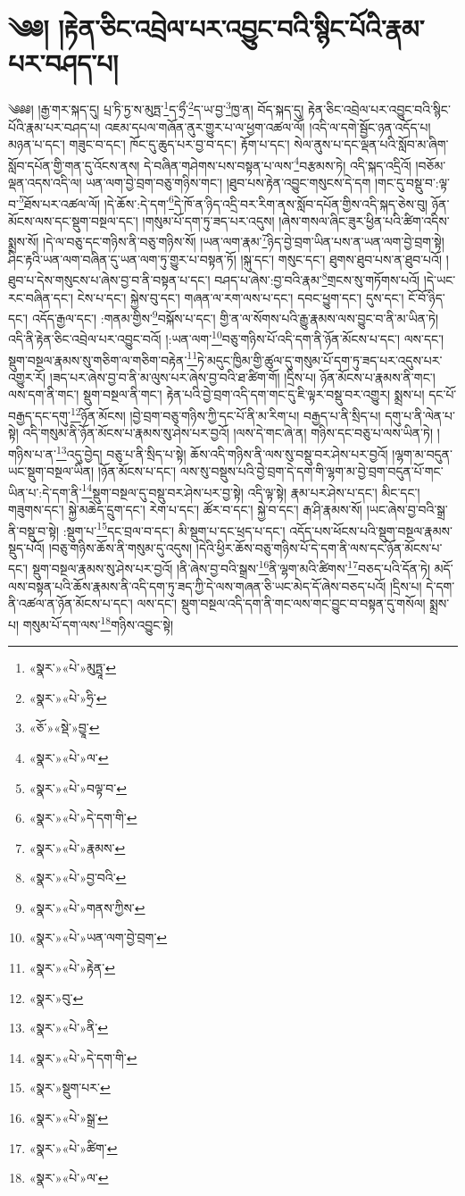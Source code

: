 \chapter{༄༅། །རྟེན་ཅིང་འབྲེལ་པར་འབྱུང་བའི་སྙིང་པོའི་རྣམ་པར་བཤད་པ།}༄༅༅། །རྒྱ་གར་སྐད་དུ། པྲ་ཏི་ཏྱ་ས་མུཏྤ་\footnote{«སྣར་»«པེ་»མུཏྤཱ་}ད་ཧྲྀ་\footnote{«སྣར་»«པེ་»ཧྲི་}ད་ཡ་བྱ་\footnote{«ཅོ་»«སྡེ་»བྱཱ་}ཁྱ་ན། བོད་སྐད་དུ། རྟེན་ཅིང་འབྲེལ་པར་འབྱུང་བའི་སྙིང་པོའི་རྣམ་པར་བཤད་པ། འཇམ་དཔལ་གཞོན་ནུར་གྱུར་པ་ལ་ཕྱག་འཚལ་ལོ། །འདི་ལ་དགེ་སྦྱོང་ཉན་འདོད་པ། མཉན་པ་དང་། གཟུང་བ་དང་། ཁོང་དུ་ཆུད་པར་བྱ་བ་དང་། རྟོག་པ་དང་། སེལ་ནུས་པ་དང་ལྡན་པའི་སློབ་མ་ཞིག་སློབ་དཔོན་གྱི་གན་དུ་འོངས་ནས། དེ་བཞིན་གཤེགས་པས་བསྟན་པ་ལས་\footnote{«སྣར་»«པེ་»ལ་}བརྩམས་ཏེ། འདི་སྐད་འདྲིའོ། །བཅོམ་ལྡན་འདས་འདི་ལ། ཡན་ལག་བྱེ་བྲག་བཅུ་གཉིས་གང་། །ཐུབ་པས་རྟེན་འབྱུང་གསུངས་དེ་དག །གང་དུ་བསྡུ་བ་:ལྟ་བ་\footnote{«སྣར་»«པེ་»བལྟ་བ་}ཐོས་པར་འཚལ་ལོ། །དེ་ཆོས་:དེ་དག་\footnote{«སྣར་»«པེ་»དེ་དག་གི་}དེ་ཁོ་ན་ཉིད་འདྲི་བར་རིག་ནས་སློབ་དཔོན་གྱིས་འདི་སྐད་ཅེས་བུ། ཉོན་མོངས་ལས་དང་སྡུག་བསྔལ་དང་། །གསུམ་པོ་དག་ཏུ་ཟད་པར་འདུས། །ཞེས་གསལ་ཞིང་ཟུར་ཕྱིན་པའི་ཚིག་འདིས་སྨྲས་སོ། །དེ་ལ་བཅུ་དང་གཉིས་ནི་བཅུ་གཉིས་སོ། །ཡན་ལག་རྣམ་\footnote{«སྣར་»«པེ་»རྣམས་}ཉིད་བྱེ་བྲག་ཡིན་པས་ན་ཡན་ལག་བྱེ་བྲག་སྟེ། ཤིང་རྟའི་ཡན་ལག་བཞིན་དུ་ཡན་ལག་ཏུ་གྱུར་པ་བསྟན་ཏོ། །སྐུ་དང་། གསུང་དང་། ཐུགས་ཐུབ་པས་ན་ཐུབ་པའོ། །ཐུབ་པ་དེས་གསུངས་པ་ཞེས་བྱ་བ་ནི་བསྟན་པ་དང་། བཤད་པ་ཞེས་:བྱ་བའི་རྣམ་\footnote{«སྣར་»«པེ་»བྱ་བའི་}གྲངས་སུ་གཏོགས་པའོ། །དེ་ཡང་རང་བཞིན་དང་། ངེས་པ་དང་། སྐྱེས་བུ་དང་། གཞན་ལ་རག་ལས་པ་དང་། དབང་ཕྱུག་དང་། དུས་དང་། ངོ་བོ་ཉིད་དང་། འདོད་རྒྱལ་དང་། :གནམ་གྱིས་\footnote{«སྣར་»«པེ་»གནས་ཀྱིས་}བསྐོས་པ་དང་། གྱི་ན་ལ་སོགས་པའི་རྒྱུ་རྣམས་ལས་བྱུང་བ་ནི་མ་ཡིན་ཏེ། འདི་ནི་རྟེན་ཅིང་འབྲེལ་པར་འབྱུང་བའོ། །:ཡན་ལག་\footnote{«སྣར་»«པེ་»ཡན་ལག་བྱེ་བྲག་}བཅུ་གཉིས་པོ་འདི་དག་ནི་ཉོན་མོངས་པ་དང་། ལས་དང་། སྡུག་བསྔལ་རྣམས་སུ་གཅིག་ལ་གཅིག་བརྟེན་\footnote{«སྣར་»«པེ་»རྟེན་}ཏེ་མདུང་ཁྱིམ་གྱི་ཚུལ་དུ་གསུམ་པོ་དག་ཏུ་ཟད་པར་འདུས་པར་འགྱུར་རོ། །ཟད་པར་ཞེས་བྱ་བ་ནི་མ་ལུས་པར་ཞེས་བྱ་བའི་ཐ་ཚིག་གོ། །དྲིས་པ། ཉོན་མོངས་པ་རྣམས་ནི་གང་། ལས་དག་ནི་གང་། སྡུག་བསྔལ་ནི་གང་། རྟེན་པའི་བྱེ་བྲག་འདི་དག་གང་དུ་ཇི་ལྟར་བསྡུ་བར་འགྱུར། སྨྲས་པ། དང་པོ་བརྒྱད་དང་དགུ་\footnote{«སྣར་»བུ་}ཉོན་མོངས། །བྱེ་བྲག་བཅུ་གཉིས་ཀྱི་དང་པོ་ནི་མ་རིག་པ། བརྒྱད་པ་ནི་སྲིད་པ། དགུ་པ་ནི་ལེན་པ་སྟེ། འདི་གསུམ་ནི་ཉོན་མོངས་པ་རྣམས་སུ་ཤེས་པར་བྱའོ། །ལས་དེ་གང་ཞེ་ན། གཉིས་དང་བཅུ་པ་ལས་ཡིན་ཏེ། །གཉིས་པ་ན་\footnote{«སྣར་»«པེ་»ནི་}འདུ་བྱེད། བཅུ་པ་ནི་སྲིད་པ་སྟེ། ཆོས་འདི་གཉིས་ནི་ལས་སུ་བསྡུ་བར་ཤེས་པར་བྱའོ། །ལྷག་མ་བདུན་ཡང་སྡུག་བསྔལ་ཡིན། །ཉོན་མོངས་པ་དང་། ལས་སུ་བསྡུས་པའི་བྱེ་བྲག་དེ་དག་གི་ལྷག་མ་བྱེ་བྲག་བདུན་པོ་གང་ཡིན་པ་:དེ་དག་ནི་\footnote{«སྣར་»«པེ་»དེ་དག་གི་}སྡུག་བསྔལ་དུ་བསྡུ་བར་ཤེས་པར་བྱ་སྟེ། འདི་ལྟ་སྟེ། རྣམ་པར་ཤེས་པ་དང་། མིང་དང་། གཟུགས་དང་། སྐྱེ་མཆེད་དྲུག་དང་། རེག་པ་དང་། ཚོར་བ་དང་། སྐྱེ་བ་དང་། རྒ་ཤི་རྣམས་སོ། །ཡང་ཞེས་བྱ་བའི་སྒྲ་ནི་བསྡུ་བ་སྟེ། :སྡུག་པ་\footnote{«སྣར་»སྡུག་པར་}དང་བྲལ་བ་དང་། མི་སྡུག་པ་དང་ཕྲད་པ་དང་། འདོད་པས་ཕོངས་པའི་སྡུག་བསྔལ་རྣམས་སྡུད་པའོ། །བཅུ་གཉིས་ཆོས་ནི་གསུམ་དུ་འདུས། །དེའི་ཕྱིར་ཆོས་བཅུ་གཉིས་པོ་དེ་དག་ནི་ལས་དང་ཉོན་མོངས་པ་དང་། སྡུག་བསྔལ་རྣམས་སུ་ཤེས་པར་བྱའོ། །ནི་ཞེས་བྱ་བའི་སྒྲས་\footnote{«སྣར་»«པེ་»སྒྲ་}ནི་ལྷག་མའི་ཚིགས་\footnote{«སྣར་»«པེ་»ཚིག་}བཅད་པའི་དོན་ཏེ། མདོ་ལས་བསྟན་པའི་ཆོས་རྣམས་ནི་འདི་དག་ཏུ་ཟད་ཀྱི་དེ་ལས་གཞན་ཅི་ཡང་མེད་དོ་ཞེས་བཅད་པའོ། །དྲིས་པ། དེ་དག་ནི་འཚལ་ན་ཉོན་མོངས་པ་དང་། ལས་དང་། སྡུག་བསྔལ་འདི་དག་ནི་གང་ལས་གང་བྱུང་བ་བསྟན་དུ་གསོལ། སྨྲས་པ། གསུམ་པོ་དག་ལས་\footnote{«སྣར་»«པེ་»ལ་}གཉིས་འབྱུང་སྟེ། 